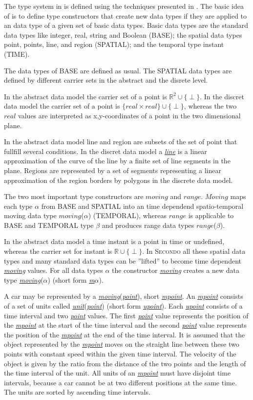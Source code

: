 \documentclass[a4paper]{article}
\newcommand{\secondo}{\textsc{Secondo}}
\newcommand{\dt}[1]{\textsl{\underline{#1}}}
\begin{document}
The type system in \cite{RepresentingMovingObjectsGueting} is defined using the
techniques presented in \cite{SecondOrderSignatureGueting}. The basic idea of
\cite{RepresentingMovingObjectsGueting} is to define type constructors
that create new data types if they are applied to an data type of a given set of
basic data types.
Basic data types are the standard data types like integer, real, string and Boolean (BASE);
the spatial data types point, points, line, and region (SPATIAL);
and the temporal type instant (TIME).

The data types of BASE are defined as usual. The SPATIAL data types are defined
by different carrier sets in the abstract and the disrete level.

In the abstract data model the carrier set of a point is $\mathbb{R}^2 \cup \{ \perp \}$.
In the discret data model the carrier set of a point is $\{ real \times real \} \cup \{ \perp \}$,
whereas the two $real$ values are interpreted as x,y-coordinates of a point in the
two dimensional plane.

In the abstract data model line and region are subsets of the set of point that
fullfill several conditions. In the discret data model a \dt{line} is a linear
approximation of the curve of the line by a finite set of line segments in the plane.
Regions are represented by a set of segments representing a linear approximation
of the region borders by polygons in the discrete data model.


The two most important type constructors are $moving$ and $range$. $Moving$
maps each type $\alpha$ from BASE and SPATIAL into an time dependend spatio-temporal
moving data type $moving$($\alpha$) (TEMPORAL), whereas $range$ is applicable to
BASE and TEMPORAL type $\beta$ and produces range data types $range$($\beta$).



In the abstract data model a time instant is a point in time or undefined, whereas
the carrier set for instant is $\mathbb{R} \cup \{ \perp \}$.
In \secondo{} all these spatial data types and many standard data types can be
''lifted'' to become time dependent \dt{moving} values. For all data types \dt{$\alpha$}
the constructor \dt{moving} creates a new data type \dt{moving}(\dt{$\alpha$})
(short form \dt{m$\alpha$}).

A car may be represented by a \dt{moving}(\dt{point}), short \dt{mpoint}.
An \dt{mpoint} consists of a set of units called
\dt{unit}(\dt{point}) (short form \dt{upoint}). Each \dt{upoint} consists of a time
interval and two \dt{point} values. The first \dt{point} value represents the
position of the \dt{mpoint} at the start of the time interval and the second
\dt{point} value represents the position of the \dt{mpoint} at the end of the
time interval. It is assumed that the object represented by the \dt{mpoint}
moves on the straight line between these two points with constant speed within the
given time interval. The velocity of the object is given by the ratio from the
distance of the two points and the length of the time interval of the unit.
All units of an \dt{mpoint} must have disjoint time intervals, because a car
cannot be at two different positions at the same time.
The units are sorted by ascending time intervals.
\end{document}

